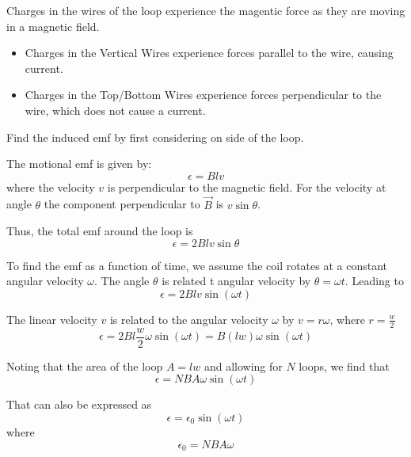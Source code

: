 \documentclass[14pt]{memoir}
\begin{document}
Charges in the wires of the loop experience the magentic force as they are moving in a magnetic field. 
\begin{itemize}
\item Charges in the Vertical Wires experience forces parallel to the wire, causing current.
\item Charges in the Top/Bottom Wires experience forces perpendicular to the wire, which does not cause a current. 
\end{itemize}

Find the induced emf by first considering on side of the loop.

The motional emf is given by:
\begin{equation}
\epsilon = B l v
\end{equation}
where the velocity $v$ is perpendicular to the magnetic field. For the velocity at angle $\theta$ the component perpendicular to $\vec{B}$ is $ v \sin{\theta}$.

Thus, the total emf around the loop is
\begin{equation}
\epsilon = 2 B l v \sin{\theta}
\end{equation}

To find the emf as a function of time, we assume the coil rotates at a constant angular velocity $\omega$. The angle $\theta$ is related t angular velocity by $\theta = \omega t$. Leading to 
\begin{equation}
\epsilon = 2 B l v \sin{(\omega t)}
\end{equation}

The linear velocity $v$ is related to the angular velocity $\omega$ by $v = r \omega$, where $r = \frac{w}{2}$ 
\begin{equation}
\epsilon = 2 B l \frac{w}{2} \omega \sin{(\omega t)} = B (lw) \omega \sin{(\omega t)}
\end{equation}

Noting that the area of the loop $A = lw$ and allowing for $N$ loops, we find that
\begin{equation}
\epsilon =  N B A \omega \sin{(\omega t)}
\end{equation}

That can also be expressed as 
\begin{equation}
\epsilon =  \epsilon_0 \sin{(\omega t)}
\end{equation}
where
\begin{equation}
\epsilon_0 = N B A \omega
\end{equation}
\end{document}
